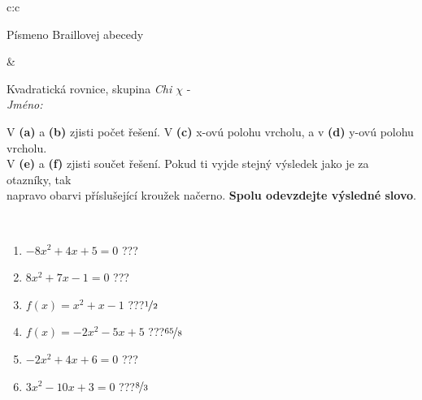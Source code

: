 \documentclass[10pt]{report}
\begin{document}
\begin{tabular}{c:c}
\begin{minipage}[c][104.5mm][t]{0.5\linewidth}
\begin{center}
\begin{minipage}{0.20\linewidth}
\begin{center}
{\small Písmeno Braillovej abecedy}
\end{center}
\end{minipage}
\end{center}
\end{minipage}
&
\begin{minipage}[c][104.5mm][t]{0.5\linewidth}
\begin{center}
\vspace{7mm}
{\huge Kvadratická rovnice, skupina \textit{Chi $\chi$} -}\\[5mm]
\textit{Jméno:}\phantom{xxxxxxxxxxxxxxxxxxxxxxxxxxxxxxxxxxxxxxxxxxxxxxxxxxxxxxxxxxxxxxxxx}\\[5mm]
\begin{minipage}{0.95\linewidth}
\begin{center}
V \textbf{(a)} a \textbf{(b)} zjisti počet řešení. V \textbf{(c)} x-ovú polohu vrcholu, a v \textbf{(d)} y-ovú polohu vrcholu.\\V \textbf{(e)} a \textbf{(f)} zjisti součet řešení. Pokud ti vyjde stejný výsledek jako je za otazníky, tak\\napravo obarvi příslušející kroužek načerno. \textbf{Spolu odevzdejte výsledné slovo}.
\end{center}
\end{minipage}
\\[1mm]
\begin{minipage}{0.79\linewidth}
\begin{center}
\begin{varwidth}{\linewidth}
\begin{enumerate}
\Large
\item $-8x^2+4x+5=0$\quad \dotfill\; ???\;\dotfill {}
\item $8x^2+7x-1=0$\quad \dotfill\; ???\;\dotfill {}
\item $f(x)=x^2+x-1$\quad \dotfill\; ???\;\dotfill \quad $\nicefrac{1}{2}$
\item $f(x)=-2x^2-5x+5$\quad \dotfill\; ???\;\dotfill \quad $\nicefrac{65}{8}$
\item $-2x^2+4x+6=0$\quad \dotfill\; ???\;\dotfill {}
\item $3x^2-10x+3=0$\quad \dotfill\; ???\;\dotfill \quad $\nicefrac{8}{3}$
\end{enumerate}
\end{varwidth}
\end{center}
\end{minipage}
\begin{minipage}{0.20\linewidth}
\begin{center}

\end{center}
\end{minipage}
\end{center}
\end{minipage}
\end{tabular}
\end{document}
